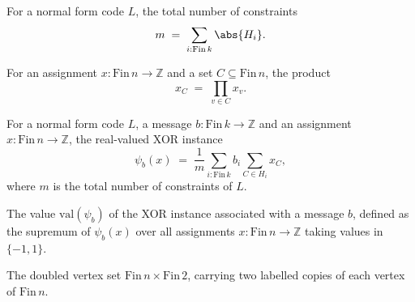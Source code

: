 \begin{definition}
\label{NormalLDC.totalConstraints}
\leanok
{}
For a normal form code $L$, the total number of constraints
\[
  m \;=\; \sum_{i : \mathrm{Fin}\,k} \abs{H_i}.
\]
\end{definition}

\begin{definition}
\label{assignment_prod}
\leanok
For an assignment $x : \mathrm{Fin}\,n \to \mathbb{Z}$ and a set
$C \subseteq \mathrm{Fin}\,n$, the product
\[
  x_C \;=\; \prod_{v \in C} x_v .
\]
\end{definition}

\begin{definition}
\label{NormalLDC.xorPoly}
\leanok
{}
For a normal form code $L$, a message $b : \mathrm{Fin}\,k \to \mathbb{Z}$ and an
assignment $x : \mathrm{Fin}\,n \to \mathbb{Z}$, the real-valued XOR instance
\[
  \psi_b(x) \;=\; \frac{1}{m} \sum_{i : \mathrm{Fin}\,k} b_i
    \sum_{C \in H_i} x_C ,
\]
where $m$ is the total number of constraints of $L$.
\end{definition}

\begin{definition}
\label{NormalLDC.xorVal}
\leanok
{}
The value $\mathrm{val}(\psi_b)$ of the XOR instance associated with a message $b$,
defined as the supremum of $\psi_b(x)$ over all assignments
$x : \mathrm{Fin}\,n \to \mathbb{Z}$ taking values in $\{-1,1\}$.
\end{definition}

\begin{definition}
\label{DoubleCopy}
\leanok
{}
The doubled vertex set $\mathrm{Fin}\,n \times \mathrm{Fin}\,2$, carrying two labelled
copies of each vertex of $\mathrm{Fin}\,n$.
\end{definition}

